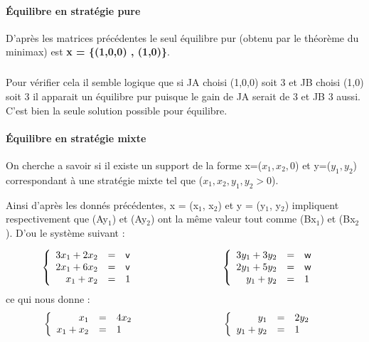 \documentclass[a4paper, 12pt, twoside]{article}
\begin{document}
\paragraph{Équilibre en stratégie pure}
D'après les matrices précédentes  le seul équilibre pur (obtenu par le théorème du \textsf{minimax}) est  \textbf{x = \{(1,0,0) , (1,0)\}}.
\subparagraph*{}{Pour vérifier cela il semble logique que si JA choisi (1,0,0) \textsf{soit 3} et \textsf{JB} choisi (1,0) \textsf{soit  3} il apparait un équilibre pur puisque le gain de JA serait de 3 et \textsf{JB} 3 aussi. C'est bien la seule solution possible pour équilibre.

\paragraph{Équilibre en stratégie mixte}
On cherche a savoir si il existe un support de la forme x=($x_{1},x_{2},0$) et y=($y_{1}, y_{2}$) correspondant à une stratégie mixte tel que ($x_{1},x_{2},y_{1}, y_{2} > 0$). 

Ainsi d'après les donnés précédentes, x = (x$_{1}$, x$_{2}$) et y = (y$_{1}$, y$_{2}$) impliquent respectivement que (Ay$ _{1} $) et (Ay$ _{2} $) ont la même valeur tout comme (Bx$ _{1} $) et (Bx$ _{2} $). D'ou le système suivant : }
\begin{align*}
\left \{
   \begin{array}{r c l}
      3x_{1} + 2x_{2} & = & \textsf{v} \\
      2x_{1} +6x_{2}  & = &\textsf{v}  \\
      x_{1} + x_{2} & = & 1
   \end{array}
   \right.
   & \hspace{3 cm}
   \left \{
   \begin{array}{r c l}
     3y_{1} + 3y_{2} & = & \textsf{w} \\
     2y_{1} + 5y_{2}  & = &\textsf{w}  \\
      y_{1} + y_{2} & = & 1
   \end{array}
   \right .
\end{align*}
ce qui nous donne : 
\begin{align*}
\left \{
   \begin{array}{r c l}
      x_{1}  & = & 4x_{2} \\
      x_{1} + x_{2} & = & 1 
   \end{array}
   \right.
   & \hspace{3 cm}
   \left \{
   \begin{array}{r c l}
     y_{1} & = & 2y_{2}  \\
      y_{1} + y_{2} & = & 1  
   \end{array}
   \right .
\end{align*}
\end{document}
